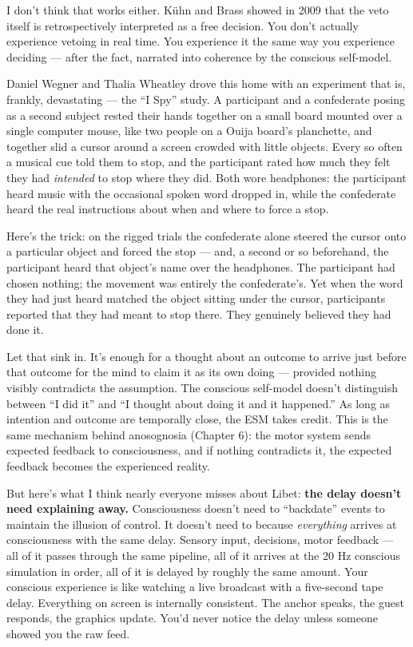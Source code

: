 \documentclass[11pt, twoside, openright]{book}
\begin{document}
I don't think that works either. Kühn and Brass showed in 2009 that the veto itself is retrospectively interpreted as a free decision. You don't actually experience vetoing in real time. You experience it the same way you experience deciding --- after the fact, narrated into coherence by the conscious self-model.

Daniel Wegner and Thalia Wheatley drove this home with an experiment that is, frankly, devastating --- the ``I Spy'' study. A participant and a confederate posing as a second subject rested their hands together on a small board mounted over a single computer mouse, like two people on a Ouija board's planchette, and together slid a cursor around a screen crowded with little objects. Every so often a musical cue told them to stop, and the participant rated how much they felt they had \textit{intended} to stop where they did. Both wore headphones: the participant heard music with the occasional spoken word dropped in, while the confederate heard the real instructions about when and where to force a stop.

Here's the trick: on the rigged trials the confederate alone steered the cursor onto a particular object and forced the stop --- and, a second or so beforehand, the participant heard that object's name over the headphones. The participant had chosen nothing; the movement was entirely the confederate's. Yet when the word they had just heard matched the object sitting under the cursor, participants reported that they had meant to stop there. They genuinely believed they had done it.

Let that sink in. It's enough for a thought about an outcome to arrive just before that outcome for the mind to claim it as its own doing --- provided nothing visibly contradicts the assumption. The conscious self-model doesn't distinguish between ``I did it'' and ``I thought about doing it and it happened.'' As long as intention and outcome are temporally close, the ESM takes credit. This is the same mechanism behind anosognosia (Chapter 6): the motor system sends expected feedback to consciousness, and if nothing contradicts it, the expected feedback becomes the experienced reality.

But here's what I think nearly everyone misses about Libet: \textbf{the delay doesn't need explaining away.} Consciousness doesn't need to ``backdate'' events to maintain the illusion of control. It doesn't need to because \textit{everything} arrives at consciousness with the same delay. Sensory input, decisions, motor feedback --- all of it passes through the same pipeline, all of it arrives at the 20 Hz conscious simulation in order, all of it is delayed by roughly the same amount. Your conscious experience is like watching a live broadcast with a five-second tape delay. Everything on screen is internally consistent. The anchor speaks, the guest responds, the graphics update. You'd never notice the delay unless someone showed you the raw feed.
\end{document}
